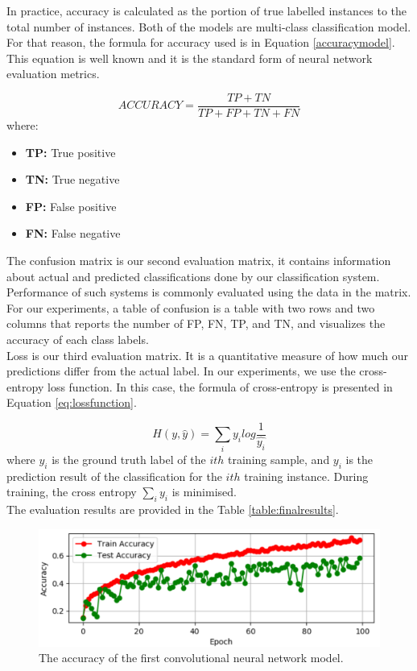 In practice, accuracy is calculated as the portion of true labelled instances to the total number of instances. Both of the models are multi-class classification model. For that reason, the formula for accuracy used is in Equation \ref{accuracymodel}. This equation is well known and it is the standard form of neural network evaluation metrics.

\begin{equation}\label{accuracymodel}
     ACCURACY=\frac{TP+TN}{TP+FP+TN+FN}
\end{equation}
where:\\
\begin{itemize}
    \item \textbf{TP:} True positive
    \item \textbf{TN:} True negative
    \item \textbf{FP:} False positive
    \item \textbf{FN:} False negative
\end{itemize}

The confusion matrix is our second evaluation matrix, it contains information about actual and predicted classifications done by our classification system. Performance of such systems is
commonly evaluated using the data in the matrix. For our experiments, a table of confusion is a table with two rows and two columns that reports the number of FP, FN, TP, and TN, and visualizes the accuracy of each class labels.\\

Loss is our third evaluation matrix. It is a quantitative measure of how much our predictions differ from the actual label. In our experiments, we use the cross-entropy loss function. In this case, the formula of cross-entropy is presented in Equation \ref{eq:lossfunction}.

\begin{equation}\label{eq:lossfunction}
    H(y,\widehat{y})=\sum _{i}y_{i}log\frac{1}{\widehat{y_{i}}}
\end{equation}
where $\widehat{y_{i}}$ is the ground truth label of the $ith$ training sample, and $y_{i}$ is the prediction result of the classification for the $ith$ training instance. During training, the cross entropy $\sum _{i}y_{i}$ is minimised.\\

The evaluation results are provided in the Table \ref{table:finalresults}.
\begin{figure}[ht]
\centering
\includegraphics[width=1.0\columnwidth]{Figures/accuracycnnmodel}
\decoRule
\caption[The accuracy of the first convolutional neural network model.]{The accuracy of the first convolutional neural network model.}
\label{fig:cnnaccuracy12}
\end{figure}

